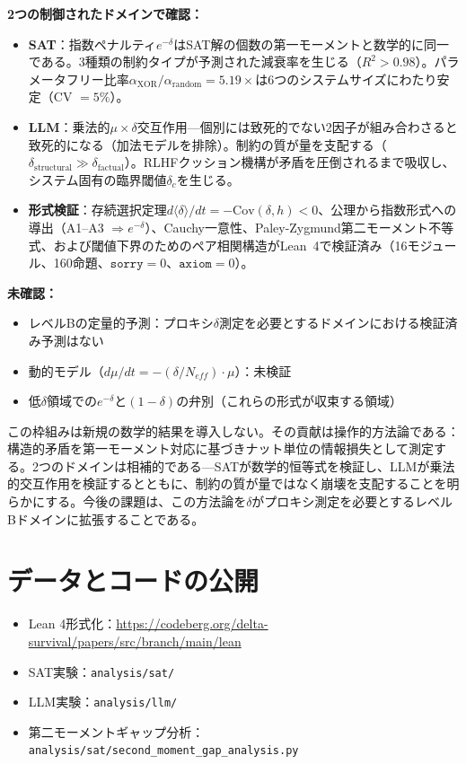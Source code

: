 \documentclass[11pt,a4paper]{article}
\begin{document}
\textbf{2つの制御されたドメインで確認：}
\begin{itemize}
    \item \textbf{SAT}：指数ペナルティ$e^{-\delta}$はSAT解の個数の第一モーメントと数学的に同一である。3種類の制約タイプが予測された減衰率を生じる（$R^2 > 0.98$）。パラメータフリー比率$\alpha_{\text{XOR}}/\alpha_{\text{random}} = 5.19\times$は6つのシステムサイズにわたり安定（CV $= 5\%$）。
    \item \textbf{LLM}：乗法的$\mu \times \delta$交互作用---個別には致死的でない2因子が組み合わさると致死的になる（加法モデルを排除）。制約の質が量を支配する（$\delta_{\text{structural}} \gg \delta_{\text{factual}}$）。RLHFクッション機構が矛盾を圧倒されるまで吸収し、システム固有の臨界閾値$\delta_c$を生じる。
    \item \textbf{形式検証}：存続選択定理$d\langle\delta\rangle/dt = -\text{Cov}(\delta, h) < 0$、公理から指数形式への導出（A1--A3 $\Rightarrow e^{-\delta}$）、Cauchy一意性、Paley-Zygmund第二モーメント不等式、および閾値下界のためのペア相関構造がLean~4で検証済み（16モジュール、160命題、$\texttt{sorry} = 0$、$\texttt{axiom} = 0$）。
\end{itemize}

\textbf{未確認：}
\begin{itemize}
    \item レベルBの定量的予測：プロキシ$\delta$測定を必要とするドメインにおける検証済み予測はない
    \item 動的モデル（$d\mu/dt = -(\delta/N_{eff}) \cdot \mu$）：未検証
    \item 低$\delta$領域での$e^{-\delta}$と$(1-\delta)$の弁別（これらの形式が収束する領域）
\end{itemize}

この枠組みは新規の数学的結果を導入しない。その貢献は操作的方法論である：構造的矛盾を第一モーメント対応に基づきナット単位の情報損失として測定する。2つのドメインは相補的である---SATが数学的恒等式を検証し、LLMが乗法的交互作用を検証するとともに、制約の質が量ではなく崩壊を支配することを明らかにする。今後の課題は、この方法論を$\delta$がプロキシ測定を必要とするレベルBドメインに拡張することである。

\section*{データとコードの公開}

\begin{itemize}
    \item Lean 4形式化：\url{https://codeberg.org/delta-survival/papers/src/branch/main/lean}
    \item SAT実験：\texttt{analysis/sat/}
    \item LLM実験：\texttt{analysis/llm/}
    \item 第二モーメントギャップ分析：\texttt{analysis/sat/second\_moment\_gap\_analysis.py}
\end{itemize}
\end{document}
